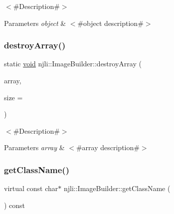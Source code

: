 $<$\#\+Description\#$>$


\begin{DoxyParams}{Parameters}
{\em object} & $<$\#object description\#$>$ \\
\hline
\end{DoxyParams}
\mbox{\label{classnjli_1_1_image_builder_a696d93cef71fa03d40ab656a3ab98954}} 
\subsubsection{\texorpdfstring{destroy\+Array()}{destroyArray()}}
{\footnotesize\ttfamily static \mbox{\hyperlink{_thread_8h_af1e856da2e658414cb2456cb6f7ebc66}{void}} njli\+::\+Image\+Builder\+::destroy\+Array (\begin{DoxyParamCaption}\item[{\mbox{\hyperlink{classnjli_1_1_image_builder}{Image\+Builder}} $\ast$$\ast$}]{array,  }\item[{const \mbox{\hyperlink{_util_8h_a10e94b422ef0c20dcdec20d31a1f5049}{u32}}}]{size = {} }\end{DoxyParamCaption})\hspace{0.3cm}{\ttfamily [static]}}

$<$\#\+Description\#$>$


\begin{DoxyParams}{Parameters}
{\em array} & $<$\#array description\#$>$ \\
\hline
\end{DoxyParams}
\mbox{\label{classnjli_1_1_image_builder_a45d64e23a5e7537aa61f6709591dac12}} 
\subsubsection{\texorpdfstring{get\+Class\+Name()}{getClassName()}}
{\footnotesize\ttfamily virtual const char$\ast$ njli\+::\+Image\+Builder\+::get\+Class\+Name (\begin{DoxyParamCaption}{ }\end{DoxyParamCaption}) const\hspace{0.3cm}{\ttfamily [virtual]}}

